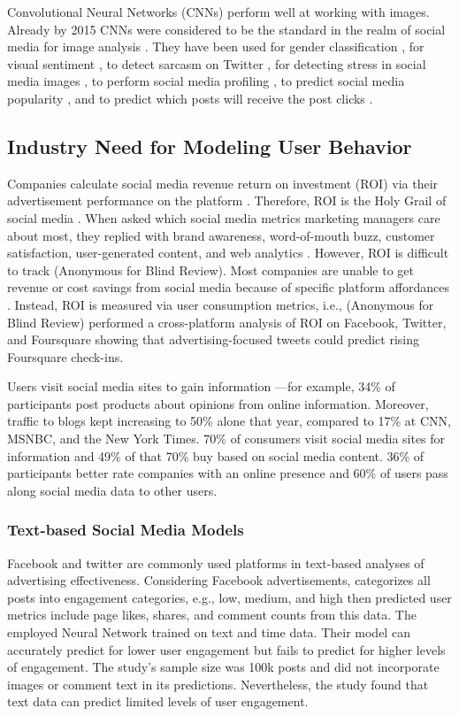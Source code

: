 \documentclass[mksc,blindrev]{informs3} %
\begin{document}
Convolutional Neural Networks (CNNs) perform well at working with images. Already by 2015 CNNs were considered to be the standard in the realm of social media for image analysis \cite{Hassner2015}. They have been used for gender classification \cite{Hassner2015}, for visual sentiment \cite{Segalin2017,Xu2014}, to detect sarcasm on Twitter \cite{Poria2016}, for detecting stress in social media images \cite{Lin2014}, to perform social media profiling \cite{Segalin2017}, to predict social media popularity \cite{Gelli2015}, and to predict which posts will receive the post clicks \cite{Khosla2014}.

\subsection{Industry Need for Modeling User Behavior}

Companies calculate social media revenue return on investment (ROI) via their advertisement performance on the platform \cite{Fisher2009}. Therefore, ROI is the Holy Grail of social media \cite{Fisher2009}. When asked which social media metrics marketing managers care about most, they replied with brand awareness, word-of-mouth buzz, customer satisfaction, user-generated content, and web analytics \cite{Tiago2014}. However, ROI is difficult to track (Anonymous for Blind Review). Most companies are unable to get revenue or cost savings from social media because of specific platform affordances \cite{Romero2011}. Instead, ROI is measured via user consumption metrics, i.e., (Anonymous for Blind Review) performed a cross-platform analysis of ROI on Facebook, Twitter, and Foursquare showing that advertising-focused tweets could predict rising Foursquare check-ins.

Users visit social media sites to gain information \cite{Schrter2021CanFP, Fisher2009, Clark2013TheIO}—for example, 34\% of participants post products about opinions from online information. Moreover, traffic to blogs kept increasing to 50\% alone that year, compared to 17\% at CNN, MSNBC, and the New York Times. 70\% of consumers visit social media sites for information and 49\% of that 70\% buy based on social media content. 36\% of participants better rate companies with an online presence and 60\% of users pass along social media data to other users. 

\subsubsection{Text-based Social Media Models}
Facebook and twitter are commonly used platforms in text-based analyses of advertising effectiveness. Considering Facebook advertisements, \cite{Lotze2021RankingCQ} categorizes all posts into engagement categories, e.g., low, medium, and high then predicted user metrics include page likes, shares, and comment counts from this data. The employed Neural Network trained on text and time data. Their model can accurately predict for lower user engagement but fails to predict for higher levels of engagement. The study’s sample size was 100k posts and did not incorporate images or comment text in its predictions. Nevertheless, the study found that text data can predict limited levels of user engagement.
\end{document}
